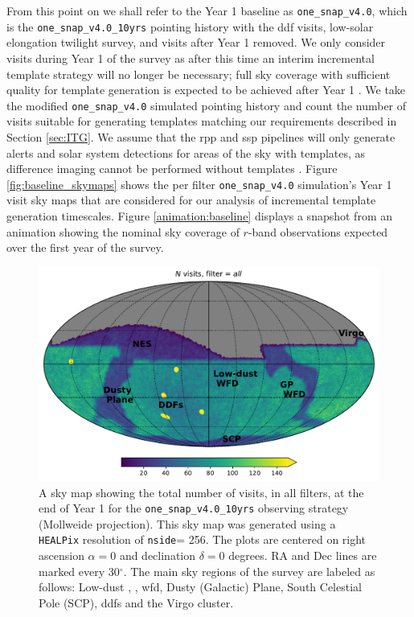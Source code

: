 \documentclass[preprintm,linenumbers]{aastex631}
\newcommand{\baseline}{\texttt{one\_snap\_v4.0}\xspace}
\newcommand{\baselinefull}{\texttt{one\_snap\_v4.0\_10yrs}\xspace}
\newcommand{\nside}{\texttt{nside}\xspace}
\newcommand{\healpix}{\texttt{HEALPix}\xspace} %
\begin{document}
    From this point on we shall refer to the Year 1 baseline as \baseline, which is the \baselinefull pointing history with the \gls*{ddf} visits,  low-solar elongation twilight survey, and visits after Year 1 removed. We only consider visits during Year 1 of the survey as after this time an interim incremental template strategy will no longer be necessary; full sky coverage with sufficient quality for template generation is expected to be achieved after Year 1 \citep{RTN-011}.  We take the modified  \baseline simulated pointing history and count the number of visits suitable for generating templates matching our requirements described in Section \ref{sec:ITG}.  We assume that the \gls*{rpp} and \gls*{ssp} pipelines will only generate alerts and solar system detections for areas of the sky with templates, as difference imaging cannot be performed without templates \citep{DMTN-107}. 
 Figure \ref{fig:baseline_skymaps} shows the per filter \baseline simulation's Year 1 visit sky maps that are considered for our analysis of incremental template generation timescales. 
 Figure \ref{animation:baseline} displays a snapshot from an animation showing the nominal sky coverage of $r$-band observations expected over the first year of the survey.

		\begin{figure}
			\begin{center}
				\includegraphics[width=0.6\columnwidth]{results/skymaps/skymap_first_year_one_snap_v4_0_10yrs_nside-256_CountMetric_all_noDD_noTwi.pdf}
				\caption{A sky map showing the total number of visits, in all filters, at the end of Year 1 for the \baselinefull observing strategy (Mollweide projection). 
    This sky map was generated using a \healpix \citep[Hierarchical Equal Area isoLatitude Pixelization; ][]{2005ApJ...622..759G}  resolution of \nside = 256.
    The plots are centered on right ascension $\alpha = 0$ and declination $\delta = 0$ degrees. RA and Dec lines are marked every 30$^\circ$.
    The main sky regions of the survey are labeled as follows: Low-dust , ,  \gls*{wfd}, Dusty (Galactic) Plane, South Celestial Pole (SCP), \glspl*{ddf} and the Virgo cluster.
    }
    \label{fig:baseline_labels}
			\end{center}
		\end{figure}
  
\end{document}
